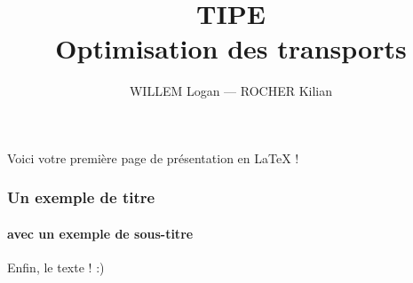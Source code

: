\documentclass[14pt]{beamer}
\title{TIPE \\ Optimisation des transports}
\author{WILLEM Logan — ROCHER Kilian}
\date{}
\begin{document}
    \maketitle

	\begin{frame}
	Voici votre première page de présentation en LaTeX !
	\end{frame}

	\begin{frame}
		\frametitle{Un exemple de titre}
		\framesubtitle{avec un exemple de sous-titre}
		Enfin, le texte ! :)
	
	\end{frame}
\end{document}
